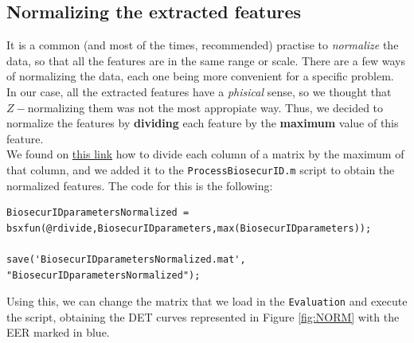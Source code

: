 \documentclass[a4paper]{article}
\def\inline{\lstinline[basicstyle=\ttfamily,keywordstyle={}]}
\begin{document}
{\subsection{Normalizing the extracted features}

It is a common (and most of the times, recommended) practise to \emph{normalize} the data, so that all the features are in the same range or scale. There are a few ways of normalizing the data, each one being more convenient for a specific problem. In our case, all the extracted features have a \emph{phisical} sense, so we thought that \(Z-\)normalizing them was not the most appropiate way. Thus, we decided to normalize the features by \textbf{dividing} each feature by the \textbf{maximum} value of this feature.\\

We found on \href{%
}{this link} how to divide each column of a matrix by the maximum of that column, and we added it to the \inline{ProcessBiosecurID.m} script to obtain the normalized features. The code for this is the following:

\begin{verbatim}
BiosecurIDparametersNormalized = bsxfun(@rdivide,BiosecurIDparameters,max(BiosecurIDparameters));

save('BiosecurIDparametersNormalized.mat', "BiosecurIDparametersNormalized");
\end{verbatim}


Using this, we can change the matrix that we load in the \inline{Evaluation} and execute the script, obtaining the DET curves represented in Figure \ref{fig:NORM} with the EER marked in blue.

}
\end{document}
